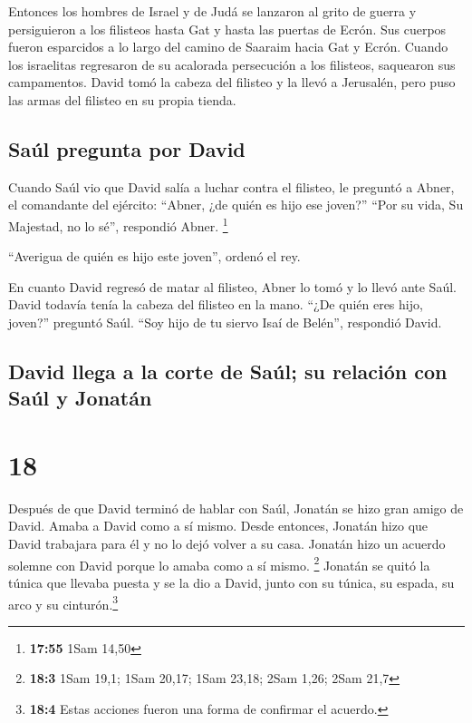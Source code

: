  Entonces los hombres de Israel y de Judá se lanzaron al
grito de guerra y persiguieron a los filisteos hasta Gat y hasta las
puertas de Ecrón. Sus cuerpos fueron esparcidos a lo largo del camino de
Saaraim hacia Gat y Ecrón.  Cuando los israelitas
regresaron de su acalorada persecución a los filisteos, saquearon sus
campamentos.  David tomó la cabeza del filisteo y la
llevó a Jerusalén, pero puso las armas del filisteo en su propia tienda.

\hypertarget{sauxfal-pregunta-por-david}{%
\subsection{Saúl pregunta por David}\label{sauxfal-pregunta-por-david}}

 Cuando Saúl vio que David salía a luchar contra el
filisteo, le preguntó a Abner, el comandante del ejército: ``Abner, ¿de
quién es hijo ese joven?'' ``Por su vida, Su Majestad, no lo sé'',
respondió Abner. \footnote{\textbf{17:55} 1Sam 14,50}

 ``Averigua de quién es hijo este joven'', ordenó el rey.

 En cuanto David regresó de matar al filisteo, Abner lo
tomó y lo llevó ante Saúl. David todavía tenía la cabeza del filisteo en
la mano.  ``¿De quién eres hijo, joven?'' preguntó Saúl.
``Soy hijo de tu siervo Isaí de Belén'', respondió David.

\hypertarget{david-llega-a-la-corte-de-sauxfal-su-relaciuxf3n-con-sauxfal-y-jonatuxe1n}{%
\subsection{David llega a la corte de Saúl; su relación con Saúl y
Jonatán}\label{david-llega-a-la-corte-de-sauxfal-su-relaciuxf3n-con-sauxfal-y-jonatuxe1n}}

\hypertarget{section-17}{%
\section{18}\label{section-17}}

 Después de que David terminó de hablar con Saúl, Jonatán
se hizo gran amigo de David. Amaba a David como a sí mismo.
 Desde entonces, Jonatán hizo que David trabajara para él
y no lo dejó volver a su casa.  Jonatán hizo un acuerdo
solemne con David porque lo amaba como a sí mismo. \footnote{\textbf{18:3}
  1Sam 19,1; 1Sam 20,17; 1Sam 23,18; 2Sam 1,26; 2Sam 21,7}
 Jonatán se quitó la túnica que llevaba puesta y se la dio
a David, junto con su túnica, su espada, su arco y su
cinturón.\footnote{\textbf{18:4} Estas acciones fueron una forma de
  confirmar el acuerdo.}

